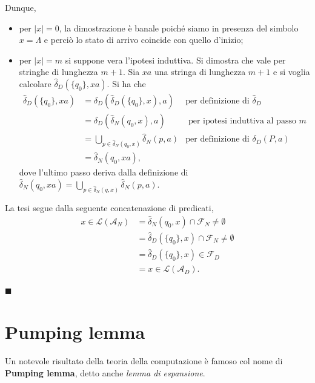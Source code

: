\documentclass[10pt]{\classname}
\theoremstyle{newlinethm}
\theoremstyle{theorem}
\theoremstyle{definition}
\theoremstyle{definition}
\theoremstyle{definition}
\theoremstyle{definition}
\begin{document}
Dunque,
\begin{itemize}
    \item per $|x|=0$, la dimostrazione è banale poiché siamo in presenza del simbolo $x=\Lambda$ e perciò lo stato di arrivo coincide con quello d'inizio;
    \item per $|x| = m$ si suppone vera l'ipotesi induttiva. Si dimostra che vale per stringhe di lunghezza $m+1$. Sia $xa$ una stringa di lunghezza $m + 1$ e si voglia calcolare $\hat \delta_D(\{q_0\}, xa).$ Si ha che
        \begin{align*}
            \hat\delta_D(\{q_0\}, xa) &= \delta_D(\hat\delta_D(\{q_0\}, x), a) & \mbox{per definizione di }\hat\delta_D \\
                                      &= \delta_D(\hat\delta_N(q_0, x), a) & \mbox{ per ipotesi induttiva al passo } m\\
                                      &= \bigcup_{p\in\hat\delta_N(q_0, x)} \hat\delta_N(p, a) & \mbox{per definizione di } \delta_D(P,a)\\
                                      &= \hat\delta_N(q_0, xa), &
        \end{align*}
        dove l'ultimo passo deriva dalla definizione di $\hat\delta_N(q_0, xa) = \bigcup_{p \in \hat\delta_N(q, x)} \hat\delta_N (p, a)$.
\end{itemize}

La tesi segue dalla seguente concatenazione di predicati,
\begin{align*}
    x \in \mathcal L (\mathcal A_N) &= \hat\delta_N(q_0, x) \cap \mathcal F_N \neq \emptyset \\
                                    &= \hat\delta_D(\{q_0\}, x) \cap \mathcal F_N \neq \emptyset \\
                                    &= \hat\delta_D(\{q_0\}, x) \in \mathcal F_D \\
                                    &= x \in \mathcal L (\mathcal A_D).
\end{align*}

\begin{flushright}
$\blacksquare$
\end{flushright}


\section{Pumping lemma}

Un notevole risultato della teoria della computazione è famoso col nome di
\textbf{Pumping lemma}, detto anche \emph{lemma di espansione}.
\end{document}
